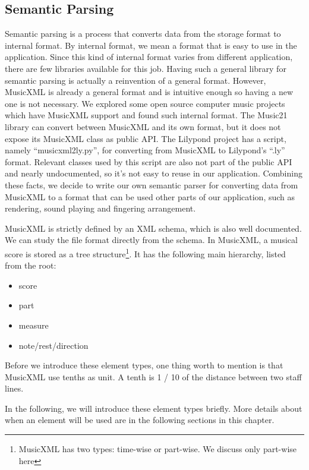 \subsection{Semantic Parsing}
Semantic parsing is a process that converts data from the storage format to internal format. By internal format, we mean a format that is easy to use in the application. Since this kind of internal format varies from different application, there are few libraries available for this job. Having such a general library for semantic parsing is actually a reinvention of  a general format. However, MusicXML is already a general format and is intuitive enough so having a new one is not necessary. We explored some open source computer music projects which have MusicXML support and found such internal format. The Music21 library \citep{cuthbert2010music21}  can convert between MusicXML and its own format, but it does not expose its MusicXML class as public API. The Lilypond \citep{nienhuys2003lilypond} project has a script, namely ``musicxml2ly.py'', for converting from MusicXML to Lilypond's ``.ly'' format. Relevant classes used by this script are also not part of the public API and nearly undocumented, so it's not easy to reuse in our application. Combining these facts, we decide to write our own semantic parser for converting data from MusicXML to a format that can be used other parts of our application, such as rendering, sound playing and fingering arrangement. 

MusicXML is strictly defined by an XML schema, which is also well documented. We can study the file format directly from the schema. In MusicXML, a musical score is stored as a tree structure\footnote{MusicXML has two types: time-wise or part-wise. We discuss only part-wise here}. It has the following main hierarchy, listed from the root: 
\begin{itemize}
    \item score
    \item part
    \item measure
    \item note/rest/direction
\end{itemize}

Before we introduce these element types, one thing worth to mention is that MusicXML use tenths as unit. A tenth is 1 / 10 of the distance between two staff lines.

In the following, we will introduce these element types briefly. More details about when an element will be used are in the following sections in this chapter.

